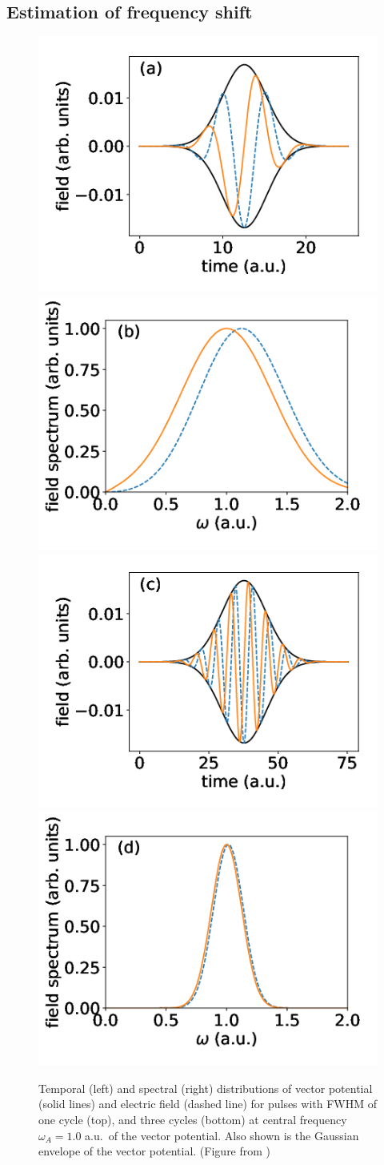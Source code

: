 \subsection{Estimation of frequency shift}
\label{sec:pulse}
\begin{figure}[!ht]
\centering
   
   \includegraphics[width=0.4\linewidth]{figs/Frequency_shift/01_field.png}
   \includegraphics[width=0.4\linewidth]{figs/Frequency_shift/01_spec.png}
   \includegraphics[width=0.4\linewidth]{figs/Frequency_shift/03_field.png}
   \includegraphics[width=0.4\linewidth]{figs/Frequency_shift/03_spec.png}
   
\caption{
Temporal (left) and spectral (right) distributions of vector potential (solid lines) and electric field (dashed line) for pulses with FWHM of one cycle (top), and three cycles (bottom) at central frequency $\omega_A = 1.0$ a.u.\  of the vector potential. Also shown is the Gaussian envelope of the vector potential. (Figure from \cite{venzke2018_Central})
} 
  \label{fig:spectra}
\end{figure}

